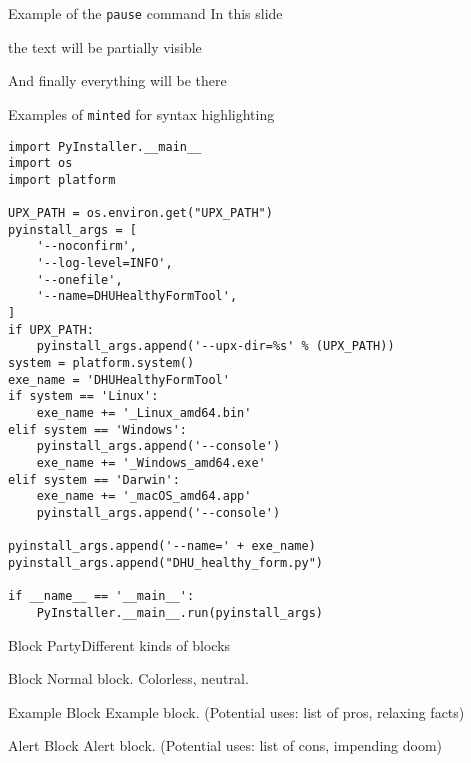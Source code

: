 \begin{frame}[c]{Example of the \texttt{pause} command}
	In this slide \pause
	
	the text will be partially visible \pause
	
	And finally everything will be there
\end{frame}

\begin{frame}[fragile]{Examples of \texttt{minted} for syntax highlighting}
	\begin{overprint}
		\begin{verbatim}
import PyInstaller.__main__
import os
import platform

UPX_PATH = os.environ.get("UPX_PATH")
pyinstall_args = [
	'--noconfirm',
	'--log-level=INFO',
	'--onefile',
	'--name=DHUHealthyFormTool',
]
if UPX_PATH:
	pyinstall_args.append('--upx-dir=%s' % (UPX_PATH))
system = platform.system()
exe_name = 'DHUHealthyFormTool'
if system == 'Linux':
	exe_name += '_Linux_amd64.bin'
elif system == 'Windows':
	pyinstall_args.append('--console')
	exe_name += '_Windows_amd64.exe'
elif system == 'Darwin':
	exe_name += '_macOS_amd64.app'
	pyinstall_args.append('--console')

pyinstall_args.append('--name=' + exe_name)
pyinstall_args.append("DHU_healthy_form.py")

if __name__ == '__main__':
	PyInstaller.__main__.run(pyinstall_args)
	\end{verbatim}
%		
	\end{overprint}

\end{frame}

\begin{frame}[c]{Block Party}{Different kinds of blocks}
	\begin{block}{Block}
		Normal block. Colorless, neutral.
	\end{block}

	\begin{exampleblock}{Example Block}
		Example block. (Potential uses: list of pros, relaxing facts)
	\end{exampleblock}

	\begin{alertblock}{Alert Block}
		Alert block. (Potential uses: list of cons, impending doom)
	\end{alertblock}
\end{frame}

